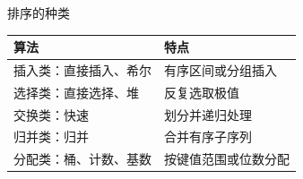 \begin{frame}
    \frametitle{\insertsectionhead}
    \begin{block}{排序的种类}
        \begin{table}
            \centering
            \smaller
            \begin{tabular}{l|l}
                \toprule
                \textbf{算法}                   & \textbf{特点}              \\
                \midrule
                插入类：直接插入、希尔             & 有序区间或分组插入 \\
                选择类：直接选择、堆               & 反复选取极值 \\
                交换类：快速                      & 划分并递归处理 \\
                归并类：归并                      & 合并有序子序列 \\
                分配类：桶、计数、基数             & 按键值范围或位数分配 \\
                \bottomrule
            \end{tabular}
        \end{table}
    \end{block}
\end{frame}

